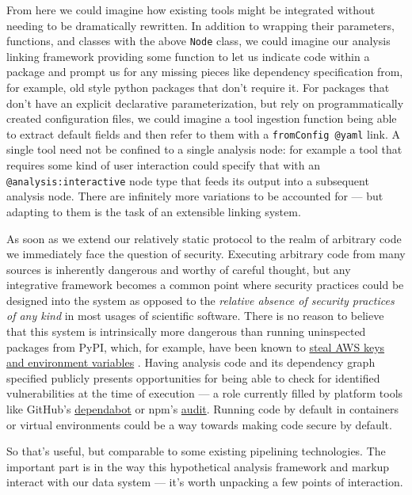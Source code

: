 From here we could imagine how existing tools might be integrated
without needing to be dramatically rewritten. In addition to wrapping
their parameters, functions, and classes with the above \texttt{Node}
class, we could imagine our analysis linking framework providing some
function to let us indicate code within a package and prompt us for any
missing pieces like dependency specification from, for example, old
style python packages that don't require it. For packages that don't
have an explicit declarative parameterization, but rely on
programmatically created configuration files, we could imagine a tool
ingestion function being able to extract default fields and then refer
to them with a \texttt{fromConfig\ @yaml} link. A single tool need not
be confined to a single analysis node: for example a tool that requires
some kind of user interaction could specify that with an
\texttt{@analysis:interactive} node type that feeds its output into a
subsequent analysis node. There are infinitely more variations to be
accounted for --- but adapting to them is the task of an extensible
linking system.

As soon as we extend our relatively static protocol to the realm of
arbitrary code we immediately face the question of security. Executing
arbitrary code from many sources is inherently dangerous and worthy of
careful thought, but any integrative framework becomes a common point
where security practices could be designed into the system as opposed to
the \emph{relative absence of security practices of any kind} in most
usages of scientific software. There is no reason to believe that this
system is intrinsically more dangerous than running uninspected packages
from PyPI, which, for example, have been known to
\href{https://blog.sonatype.com/python-packages-upload-your-aws-keys-env-vars-secrets-to-web}{steal
AWS keys and environment variables} \citep{sharmaPythonPackagesUpload2022} . Having analysis code and its
dependency graph specified publicly presents opportunities for being
able to check for identified vulnerabilities at the time of execution
--- a role currently filled by platform tools like GitHub's
\href{https://github.com/dependabot}{dependabot} or npm's
\href{https://docs.npmjs.com/auditing-package-dependencies-for-security-vulnerabilities}{audit}.
Running code by default in containers or virtual environments could be a
way towards making code secure by default.

So that's useful, but comparable to some existing pipelining
technologies. The important part is in the way this hypothetical
analysis framework and markup interact with our data system --- it's
worth unpacking a few points of interaction.

